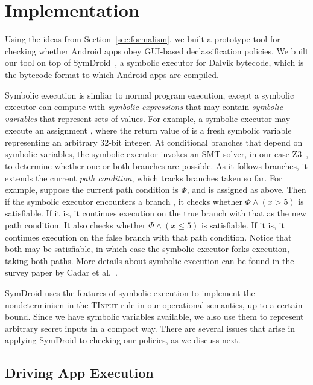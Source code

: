 \documentclass{entcs} \usepackage{entcsmacro}
\newcommand{\code}[1]{\text{\lstinline!#1!}}
\begin{document}
\section{Implementation}
\label{sec:implementation}

Using the ideas from Section~\ref{sec:formalism}, we built a prototype
tool for checking whether Android apps obey GUI-based declassification
policies. We built our tool on top of SymDroid~\cite{Jeon:2012}, a
symbolic executor for Dalvik bytecode, which is the bytecode format to
which Android apps are compiled.

Symbolic execution \cite{King:1976} is simliar to normal program
execution, except a symbolic executor can compute with \emph{symbolic
  expressions} that may contain \emph{symbolic variables} that
represent sets of values. For example, a symbolic executor may execute
an assignment \code{int x=new_sym()}, where the return value of
\code{new_sym} is a fresh symbolic variable representing an arbitrary
32-bit integer.  At conditional branches that depend on symbolic
variables, the symbolic executor invokes an SMT solver, in our case
Z3~\cite{deMoura:2008}, to determine whether one or both branches are
possible. As it follows branches, it extends the current \emph{path
  condition}, which tracks branches taken so far. For example, suppose
the current path condition is $\Phi$, and \code{x} is assigned as
above. Then if the symbolic executor encounters a branch \code{if
  (x>5)...}, it checks whether $\Phi\wedge(x>5)$ is satisfiable. If it
is, it continues execution on the true branch with that as the new
path condition. It also checks whether $\Phi\wedge(x\leq 5)$ is
satisfiable. If it is, it continues execution on the false branch with
that path condition. Notice that both may be satisfiable, in which
case the symbolic executor forks execution, taking both
paths. More details about symbolic execution can be found in the
survey paper by Cadar et al.~\cite{Cadar:13}.

SymDroid uses the features of symbolic execution to implement the
nondeterminism in the \textsc{TInput} rule in our operational
semantics, up to a certain bound. Since we have symbolic variables
available, we also use them to represent arbitrary secret inputs in a
compact way. There are several issues that arise in applying SymDroid
to checking our policies, as we discuss next.

\subsection{Driving App Execution}
\end{document}
